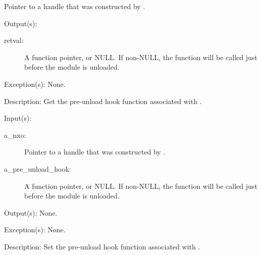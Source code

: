 \begin{capi}
\begin{capilist}
\begin{description}
			Pointer to a handle  that was constructed
			by .
		\end{description}
	\item[Output(s): ]
		\begin{description}\item[]
		\item[retval: ]
			A function pointer, or NULL.  If non-NULL, the function
			will be called just before the module is unloaded.
		\end{description}
	\item[Exception(s): ] None.
	\item[Description: ]
		Get the pre-unload hook function associated with .
	\end{capilist}
\label{nxm_pre_unload_hook_set}
	\begin{capilist}
	\item[Input(s): ]
		\begin{description}\item[]
		\item[a\_nxo: ]
			Pointer to a handle  that was constructed
			by .
		\item[a\_pre\_unload\_hook: ]
			A function pointer, or NULL.  If non-NULL, the function
			will be called just before the module is unloaded.
		\end{description}
	\item[Output(s): ] None.
	\item[Exception(s): ] None.
	\item[Description: ]
		Set the pre-unload hook function associated with .
	\end{capilist}
\end{capi}
